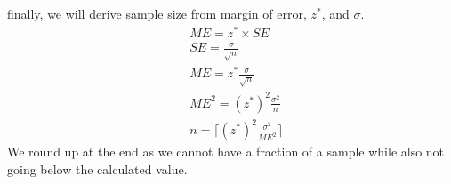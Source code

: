 \documentclass{article}
\theoremstyle{definition}
\theoremstyle{remark}
\begin{document}
finally, we will derive sample size from margin of error, $z^{*}$, and $\sigma$.
\begin{equation}
  \begin{aligned}
    & ME = z^{*} \times SE \\
    & SE = \frac{\sigma}{\sqrt{n}} \\ 
    & ME = z^{*} \frac{\sigma}{\sqrt{n}} \\
    & ME^{2} = (z^{*})^{2} \frac{\sigma^{2}}{n} \\ 
    & n = \lceil (z^{*})^{2} \frac{\sigma^{2}}{ME^{2}} \rceil 
  \end{aligned}
\end{equation}
We round up at the end as we cannot have a fraction of a sample while also not going below the calculated value.
\end{document}
